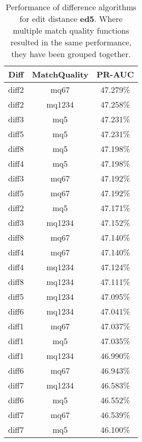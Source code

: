 \begin{table}[tbph]
\begin{center}
\begin{tabular}{|c|c||c|}
\hline
Diff & MatchQuality & PR-AUC  \\
\hline
\hline
diff2 & mq67 & 47.279\% \\
diff2 & mq1234 & 47.258\% \\
diff3 & mq5 & 47.231\% \\
diff5 & mq5 & 47.231\% \\
diff8 & mq5 & 47.198\% \\
diff4 & mq5 & 47.198\% \\
diff3 & mq67 & 47.192\% \\
diff5 & mq67 & 47.192\% \\
diff2 & mq5 & 47.171\% \\
diff3 & mq1234 & 47.152\% \\
diff8 & mq67 & 47.140\% \\
diff4 & mq67 & 47.140\% \\
diff4 & mq1234 & 47.124\% \\
diff8 & mq1234 & 47.111\% \\
diff5 & mq1234 & 47.095\% \\
diff6 & mq1234 & 47.041\% \\
diff1 & mq67 & 47.037\% \\
diff1 & mq5 & 47.035\% \\
diff1 & mq1234 & 46.990\% \\
diff6 & mq67 & 46.943\% \\
diff7 & mq1234 & 46.583\% \\
diff6 & mq5 & 46.552\% \\
diff7 & mq67 & 46.539\% \\
diff7 & mq5 & 46.100\% \\
\hline
\end{tabular}
\end{center}
\caption{Performance of difference algorithms for
  edit distance \textbf{ed5}.  Where multiple match
  quality functions resulted in the same performance, they
  have been grouped together.}
\label{tab:editlongbyed5}
\end{table}
